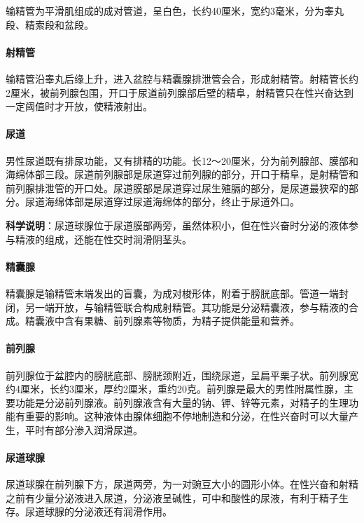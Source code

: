 输精管为平滑肌组成的成对管道，呈白色，长约40厘米，宽约3毫米，分为睾丸段、精索段和盆段。

\paragraph{射精管}

输精管沿睾丸后缘上升，进入盆腔与精囊腺排泄管会合，形成射精管。射精管长约2厘米，被前列腺包围，开口于尿道前列腺部后壁的精阜，射精管只在性兴奋达到一定阈值时才开放，使精液射出。

\paragraph{尿道}

男性尿道既有排尿功能，又有排精的功能。长12～20厘米，分为前列腺部、膜部和海绵体部三段。尿道前列腺部是尿道穿过前列腺的部分，开口于精阜，是射精管和前列腺排泄管的开口处。尿道膜部是尿道穿过尿生殖膈的部分，是尿道最狭窄的部分。尿道海绵体部是尿道穿过尿道海绵体的部分，终止于尿道外口。

\textbf{科学说明}：尿道球腺位于尿道膜部两旁，虽然体积小，但在性兴奋时分泌的液体参与精液的组成，还能在性交时润滑阴茎头。

\paragraph{精囊腺}

精囊腺是输精管末端发出的盲囊，为成对梭形体，附着于膀胱底部。管道一端封闭，另一端开放，与输精管联合构成射精管。其功能是分泌精囊液，参与精液的合成。精囊液中含有果糖、前列腺素等物质，为精子提供能量和营养。

\paragraph{前列腺}

前列腺位于盆腔内的膀胱底部、膀胱颈附近，围绕尿道，呈扁平栗子状。前列腺宽约4厘米，长约3厘米，厚约2厘米，重约20克。前列腺是最大的男性附属性腺，主要功能是分泌前列腺液。前列腺液含有大量的钠、钾、锌等元素，对精子的生理功能有重要的影响。这种液体由腺体细胞不停地制造和分泌，在性兴奋时可以大量产生，平时有部分渗入润滑尿道。

\paragraph{尿道球腺}

尿道球腺在前列腺下方，尿道两旁，为一对豌豆大小的圆形小体。在性兴奋和射精之前有少量分泌液进入尿道，分泌液呈碱性，可中和酸性的尿液，有利于精子生存。尿道球腺的分泌液还有润滑作用。

